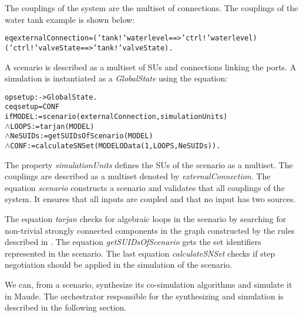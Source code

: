 The couplings of the system are the multiset of connections.
The couplings of the water tank example is shown below:
\begin{alltt}
  \small
eq externalConnection = ('tank ! 'waterlevel ==> 'ctrl ! 'waterlevel) 
  ('ctrl ! 'valveState ==> 'tank ! 'valveState)  .
\end{alltt}


A scenario is described as a multiset of SUs and connections linking the ports.
A simulation is instantiated as a \textit{GlobalState} using the equation:
\begin{alltt}
\small
op setup : -> GlobalState .
ceq setup = { CONF }
  if MODEL := scenario(externalConnection, simulationUnits)
  \(\land\) LOOPS := tarjan(MODEL)
  \(\land\) NeSUIDs := getSUIDsOfScenario(MODEL)
  \(\land\) CONF := calculateSNSet(MODEL OData(1,LOOPS, NeSUIDs)) .
\end{alltt}

The property \textit{simulationUnits} defines the SUs of the scenario as a multiset.
The couplings are described as a multiset denoted by \textit{externalConnection}.
The equation \textit{scenario} constructs a scenario and validates that all couplings of the system.
It ensures that all inputs are coupled and that no input has two sources.

The equation \textit{tarjan} checks for algebraic loops in the scenario by searching for non-trivial strongly connected components in the graph constructed by the rules described in \cite{Gomes2019c}.  
The equation \textit{getSUIDsOfScenario} gets the set identifiers represented in the scenario.
The last equation \textit{calculateSNSet} checks if step negotiation should be applied in the simulation of the scenario.

We can, from a scenario, synthesize its co-simulation algorithms and simulate it in Maude.
The orchestrator responsible for the synthesizing and simulation is described in the following section.  